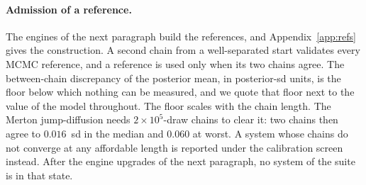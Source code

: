 \documentclass[10pt]{article}
\begin{document}
\paragraph{Admission of a reference.} The engines of the next paragraph build the references, and
Appendix~\ref{app:refs} gives the construction. A second chain from a well-separated start validates
every MCMC reference, and a reference is used only when its two chains agree. The between-chain
discrepancy of the posterior mean, in posterior-sd units, is the floor below which nothing can be
measured, and we quote that floor next to the value of the model throughout. The floor scales with the
chain length. The Merton jump-diffusion needs $2 \times 10^5$-draw chains to clear it: two chains then
agree to $0.016$~sd in the median and $0.060$ at worst. A system whose chains do not converge at any
affordable length is reported under the calibration screen instead. After the engine upgrades of the
next paragraph, no system of the suite is in that state.
\end{document}
